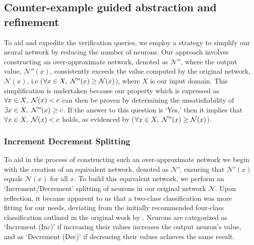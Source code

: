 \subsection{Counter-example guided abstraction and refinement}
To aid and expedite the verification queries, we employ a strategy to simplify 
our neural network by reducing the number of neurons. Our approach involves
 constructing an over-approximate network, denoted as $\mathcal{N''}$, where 
 the output value, $\mathcal{N''}(x)$, consistently exceeds the value computed 
 by the original network, $\mathcal{N}(x)$, i.e ($\forall x \in X, \hspace{1mm} 
 \mathcal{N''}(x) \geq \mathcal{N}(x)$), where $X$ is our input domain. This
  simplification is undertaken because our property which is expressed as
   $\forall x \in X, \hspace{1mm} \mathcal{N}(x) < c$ can then be proven by 
   determining the unsatisfiability of $\exists x \in X, \hspace{1mm}\mathcal{N''}(x)
 \geq c$. If the answer to this question is `Yes,' then it implies that
  $\forall x \in X, \hspace{1mm} \mathcal{N}(x) < c$ holds, as evidenced by 
  ($\forall x \in X, \hspace{1mm} \mathcal{N''}(x) \geq \mathcal{N}(x)$).



\subsubsection{Increment Decrement Splitting}
To aid in the process of constructing such an over-approximate network 
we begin with the creation of an equivalent network, denoted as $\mathcal{N}'$,
 ensuring that $\mathcal{N'}(x)$ equals $\mathcal{N}(x)$ for all $x$.
To build this equivalent network, we perform an `Increment/Decrement'
splitting of neurons in our original network $\mathcal{N}$. Upon reflection, 
it became apparent to us that a two-class classification was more fitting for 
our needs, deviating from the initially recommended four-class classification 
outlined in the original work by \cite{cegar-nn}. Neurons are categorized as 
`Increment (Inc)' if increasing their values increases the output neuron's value,
 and as `Decrement (Dec)' if decreasing their values achieves the same result.

